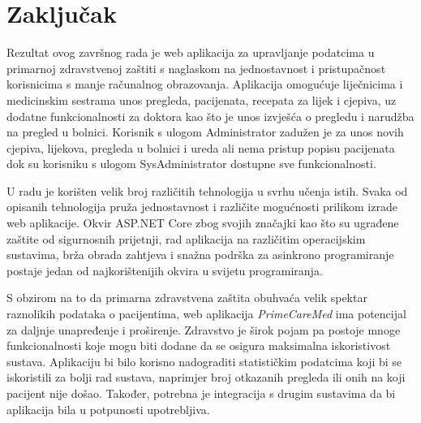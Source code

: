 \section{Zaključak}

Rezultat ovog završnog rada je web aplikacija za upravljanje podatcima u primarnoj zdravstvenoj zaštiti s naglaskom na jednostavnost i pristupačnost korisnicima s manje računalnog obrazovanja. Aplikacija omogućuje liječnicima i medicinskim sestrama unos pregleda, pacijenata, recepata za lijek i cjepiva, uz dodatne funkcionalnosti za doktora kao što je unos izvješća o pregledu i narudžba na pregled u bolnici. Korisnik s ulogom Administrator zadužen je za unos novih cjepiva, lijekova, pregleda u bolnici i ureda ali nema pristup popisu pacijenata dok su korisniku s ulogom SysAdministrator dostupne sve funkcionalnosti.

U radu je korišten velik broj različitih tehnologija u svrhu učenja istih. Svaka od opisanih tehnologija pruža jednostavnost i različite mogućnosti prilikom izrade web aplikacije. Okvir ASP.NET Core zbog svojih značajki kao što su ugrađene zaštite od sigurnosnih prijetnji, rad aplikacija na različitim operacijskim sustavima, brža obrada zahtjeva i snažna podrška za asinkrono programiranje postaje jedan od najkorištenijih okvira u svijetu programiranja.

S obzirom na to da primarna zdravstvena zaštita obuhvaća velik spektar raznolikih podataka o pacijentima, web aplikacija \textit{PrimeCareMed} ima potencijal za daljnje unapređenje i proširenje. Zdravstvo je širok pojam pa postoje mnoge funkcionalnosti koje mogu biti dodane da se osigura maksimalna iskoristivost sustava. Aplikaciju bi bilo korisno nadograditi statističkim podatcima koji bi se iskoristili za bolji rad sustava, naprimjer broj otkazanih pregleda ili onih na koji pacijent nije došao. Također, potrebna je integracija s drugim sustavima da bi aplikacija bila u potpunosti upotrebljiva.


